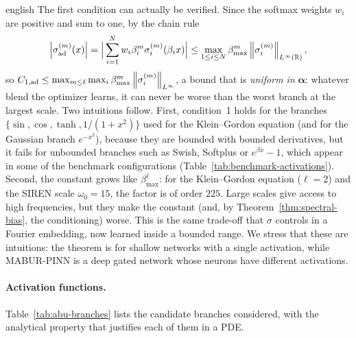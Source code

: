 \begin{hyphenrules}{english}
The first condition can actually be verified. Since the softmax weights $w_i$ are positive and sum to one,
by the chain rule
\begin{equation}
  \left\lvert \sigma^{(m)}_{\mathrm{ad}}(x) \right\rvert=\Big|\sum_{i=1}^{N}w_i\beta_i^{m}\sigma_i^{(m)}(\beta_ix)\Big|
  \le\max_{1\le i\le N}\beta_{\max}^{m}\left\lVert \sigma_i^{(m)} \right\rVert_{L^\infty(\mathbb{R})},
  \label{eq:abu-bound}
\end{equation}
so $C_{1,\mathrm{ad}}\le\max_{m\le\ell}\max_i\beta_{\max}^{m}\left\lVert \sigma_i^{(m)} \right\rVert_{L^\infty}$, a bound that is
\emph{uniform in} $\bm\alpha$: whatever blend the optimizer learns, it can never be worse than the worst
branch at the largest scale. Two intuitions follow. First, condition~1 holds for the branches
$\{\sin,\cos,\tanh,1/(1+x^2)\}$ used for the Klein--Gordon equation (and for the Gaussian branch
$e^{-x^2}$), because they are bounded with bounded derivatives, but it fails for unbounded branches such as
Swish, Softplus or $e^{\beta x}-1$, which appear in some of the benchmark configurations
(Table~\ref{tab:benchmark-activations}). Second, the constant grows like $\beta_{\max}^{\ell}$: for the
Klein--Gordon equation ($\ell=2$) and the SIREN scale $\omega_0=15$, the factor is of order $225$. Large
scales give access to high frequencies, but they make the constant (and, by Theorem~\ref{thm:spectral-bias}, the
conditioning) worse. This is the same trade-off that $\sigma$ controls in a Fourier embedding, now learned
inside a bounded range. We stress that these are intuitions: the theorem is for shallow networks with a
single activation, while MABUR-PINN is a deep gated network whose neurons have different activations.

\paragraph{Activation functions.}
Table~\ref{tab:abu-branches} lists the candidate branches considered, with the analytical property that
justifies each of them in a PDE.


\end{hyphenrules}
